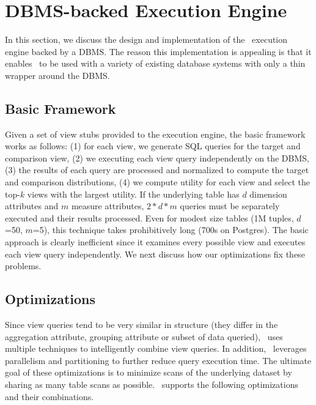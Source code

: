 \section{DBMS-backed Execution Engine}
In this section, we discuss the design and implementation of the \SeeDB\
execution engine backed by a DBMS.
The reason this implementation is appealing is that it enables \SeeDB\ to be
used with a variety of existing database systems with only a thin wrapper around
the DBMS.

\subsection{Basic Framework}
\label{sec:basic_framework}
Given a set of view stubs provided to the execution engine, the basic framework
works as follows: (1) for each view, we generate SQL queries for the target and
comparison view, (2) we executing each view query independently on the DBMS, (3)
the results of each query are processed and normalized to compute the target and
comparison distributions, (4) we compute utility for each view and select
the top-$k$ views with the largest utility.
If the underlying table has $d$ dimension attributes and $m$ measure attributes,
$2\ast d \ast m$ queries must be separately executed and their results
processed. Even for modest size tables (1M tuples, $d$=50, $m$=5), this
technique takes prohibitively long (700s on Postgres). The basic approach is
clearly inefficient since it examines every possible view and executes each view
query independently. We next discuss how our optimizations fix these problems. 

\subsection{Optimizations} 
\label{sec:optimizations}
Since view queries tend to be very similar in structure (they differ in the
aggregation attribute, grouping attribute or subset of data queried), \SeeDB\
uses multiple techniques to intelligently combine view queries. 
In addition, \SeeDB\ leverages
parallelism and partitioning to further reduce query execution time. The
ultimate goal of these optimizations is to minimize scans of the underlying
dataset by sharing as many table scans as possible. 
\SeeDB\ supports the following optimizations and their combinations.

